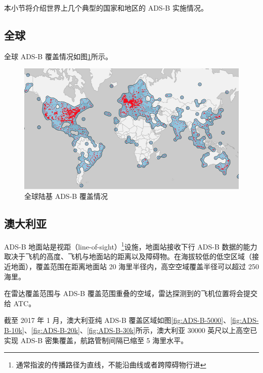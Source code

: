 本小节将介绍世界上几个典型的国家和地区的 ADS-B 实施情况。

\subsection{全球}

全球 ADS-B 覆盖情况如图\ref{fig:1ADS-B-coverage}所示。

\begin{figure}[htbp]
\centering
\includegraphics[width=14cm]{pic/1ADS-B-coverage.png}
\caption{全球陆基 ADS-B 覆盖情况\protect\footnotemark}
\label{fig:1ADS-B-coverage}
\end{figure}


\subsection{澳大利亚}

ADS-B 地面站是视距（line-of-sight）\footnote{通常指波的传播路径为直线，不能沿曲线或者跨障碍物行进}设施，地面站接收下行 ADS-B 数据的能力取决于飞机的高度、飞机与地面站的距离以及障碍物。在海拔较低的低空区域（接近地面），覆盖范围在距离地面站 20 海里半径内，高空空域覆盖半径可以超过 250 海里。

在雷达覆盖范围与 ADS-B 覆盖范围重叠的空域，雷达探测到的飞机位置将会提交给 ATC。

截至 2017 年 1 月，澳大利亚纯 ADS-B 覆盖区域如图\ref{fig:ADS-B-5000}、\ref{fig:ADS-B-10k}、\ref{fig:ADS-B-20k}、\ref{fig:ADS-B-30k}所示，澳大利亚 30000 英尺以上高空已实现 ADS-B 密集覆盖，航路管制间隔已缩至 5 海里水平。

